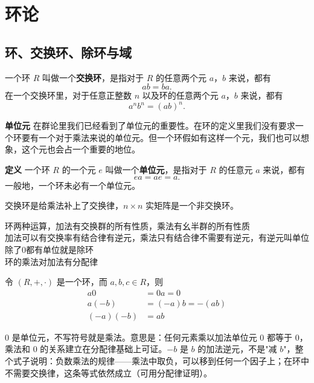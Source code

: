 \chapter{环论}

\section{环、交换环、除环与域}

\begin{definition}[交换环与单位元]
一个环 $R$ 叫做一个\textbf{交换环}，是指对于 $R$ 的任意两个元 $a$，$b$ 来说，都有
\[
ab=ba.
\]
在一个交换环里，对于任意正整数 $n$ 以及环的任意两个元 $a$，$b$ 来说，都有
\[
a^n b^n=(ab)^n.
\]

\textbf{单位元} \quad 在群论里我们已经看到了单位元的重要性。在环的定义里我们没有要求一个环要有一个对于乘法来说的单位元。但一个环假如有这样一个元，我们也可以想象，这个元也会占一个重要的地位。

\textbf{定义} \quad 一个环 $R$ 的一个元 $e$ 叫做一个\textbf{单位元}，是指对于 $R$ 的任意元 $a$ 来说，都有
\[
ea=ae=a.
\]
一般地，一个环未必有一个单位元。
\end{definition}

\begin{note}
交换环是给乘法补上了交换律，$n\times n$ 实矩阵是一个非交换环。
\end{note}

\begin{note}[环定义2 1]
环两种运算，加法有交换群的所有性质，乘法有幺半群的所有性质 \\
加法可以有交换率有结合律有逆元，乘法只有结合律不需要有逆元，有逆元叫单位除了0都有单位就是除环 \\
环的乘法对加法有分配律
\end{note}

\begin{proposition}[命题 2.1：负元、$0$ 元的运算]
令 $(R,+,\cdot)$ 是一个环，而 $a,b,c\in R$，则
\begin{align}
a0&=0a=0\\
a(-b)&=(-a)b=-(ab)\\
(-a)(-b)&=ab
\end{align}

$0$ 是单位元，不写符号就是乘法。意思是：任何元素乘以加法单位元 $0$ 都等于 $0$，乘法和 $0$ 的关系建立在分配律基础上可证。$-b$ 是 $b$ 的加法逆元，不是"减 $b$"，整个式子说明：负数乘法的规律——乘法中取负，可以移到任何一个因子上；在环中不需要交换律，这条等式依然成立（可用分配律证明）。
\end{proposition}

